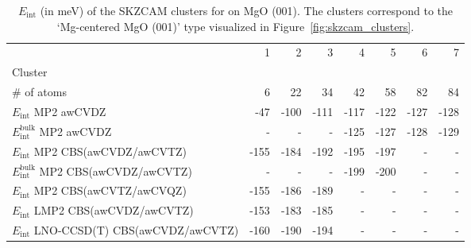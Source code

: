 \begin{table}
\caption{\label{tab:system_eint_mgo_co}$E_\textrm{int}$ (in meV) of the SKZCAM clusters for  on MgO (001). The clusters correspond to the `Mg-centered MgO (001)' type visualized in Figure~\ref{fig:skzcam_clusters}.}
\begin{adjustbox}{center,max width=1.4\textwidth}
\begin{tabular}{lrrrrrrr}
\toprule
 & 1 & 2 & 3 & 4 & 5 & 6 & 7 \\ 
Cluster &  &  &  &  &  &  &  \\
\midrule
\# of atoms & 6 & 22 & 34 & 42 & 58 & 82 & 84 \\
$E_\textrm{int}$ MP2 awCVDZ & -47 & -100 & -111 & -117 & -122 & -127 & -128 \\
$E_\textrm{int}^\textrm{bulk}$ MP2 awCVDZ & - & - & - & -125 & -127 & -128 & -129 \\
$E_\textrm{int}$ MP2 CBS(awCVDZ/awCVTZ) & -155 & -184 & -192 & -195 & -197 & - & - \\
$E_\textrm{int}^\textrm{bulk}$ MP2 CBS(awCVDZ/awCVTZ) & - & - & - & -199 & -200 & - & - \\
$E_\textrm{int}$ MP2 CBS(awCVTZ/awCVQZ) & -155 & -186 & -189 & - & - & - & - \\
$E_\textrm{int}$ LMP2 CBS(awCVDZ/awCVTZ) & -153 & -183 & -185 & - & - & - & - \\
$E_\textrm{int}$ LNO-CCSD(T) CBS(awCVDZ/awCVTZ) & -160 & -190 & -194 & - & - & - & - \\
\bottomrule
\end{tabular}
\end{adjustbox}
\end{table}

